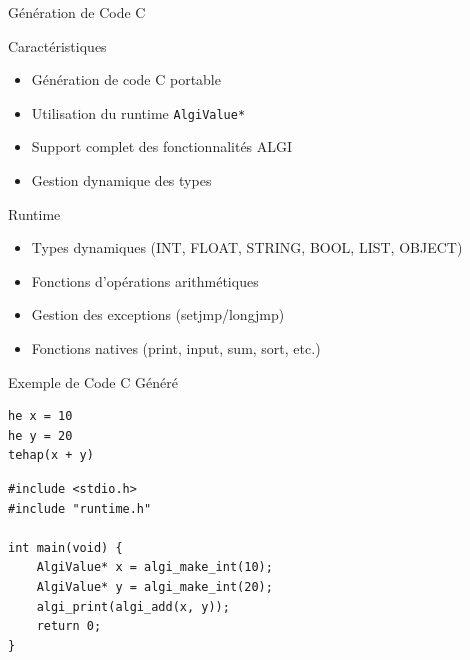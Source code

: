 \documentclass[10pt]{beamer}
\begin{document}
\begin{frame}{Génération de Code C}
    \begin{block}{Caractéristiques}
        \begin{itemize}
            \item Génération de code C portable
            \item Utilisation du runtime \texttt{AlgiValue*}
            \item Support complet des fonctionnalités ALGI
            \item Gestion dynamique des types
        \end{itemize}
    \end{block}
    
    \begin{block}{Runtime}
        \begin{itemize}
            \item Types dynamiques (INT, FLOAT, STRING, BOOL, LIST, OBJECT)
            \item Fonctions d'opérations arithmétiques
            \item Gestion des exceptions (setjmp/longjmp)
            \item Fonctions natives (print, input, sum, sort, etc.)
        \end{itemize}
    \end{block}
\end{frame}

\begin{frame}[fragile]{Exemple de Code C Généré}
    \begin{lstlisting}[style=algi-style, caption={Code ALGI}]
he x = 10
he y = 20
tehap(x + y)
\end{lstlisting}
    \begin{lstlisting}[style=algi-style, caption={Code C Généré}]
#include <stdio.h>
#include "runtime.h"

int main(void) {
    AlgiValue* x = algi_make_int(10);
    AlgiValue* y = algi_make_int(20);
    algi_print(algi_add(x, y));
    return 0;
}
\end{lstlisting}
\end{frame}
\end{document}
